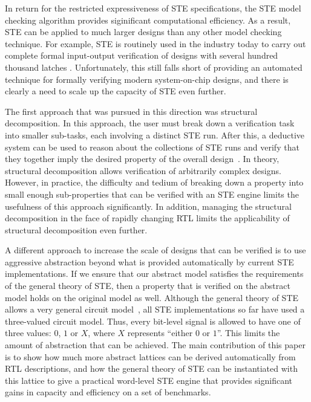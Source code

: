 \documentclass{llncs}
\begin{document}
In return for the restricted expressiveness of STE specifications, the
STE model checking algorithm provides siginificant computational
efficiency.  As a result, STE can be applied to much larger designs
than any other model checking technique.  For example, STE is
routinely used in the industry today to carry out complete formal
input-output verification of designs with several hundred thousand
latches \cite{KumarGuptaGhughal12,KaivolaEtAl09}.  Unfortunately, this
still falls short of providing an automated technique for formally
verifying modern system-on-chip designs, and there is clearly a need
to scale up the capacity of STE even further.

The first approach that was pursued in this direction was structural
decomposition.  In this approach, the user must break down a
verification task into smaller sub-tasks, each involving a distinct STE
run.  After this, a deductive system can be used to reason about the
collections of STE runs and verify that they together imply the
desired property of the overall design~\cite{JonesOSAM01}.
In theory, structural decomposition allows verification of arbitrarily
complex designs.  However, in practice, the difficulty and tedium of
breaking down a property into small enough sub-properties that can be
verified with an STE engine limits the usefulness of this approach
significantly.  In addition, managing the structural decomposition in
the face of rapidly changing RTL limits the applicability of
structural decomposition even further.

A different approach to increase the scale of designs that can be
verified is to use aggressive abstraction beyond what is provided
automatically by current STE implementations.  If we ensure that our
abstract model satisfies the requirements of the general theory of
STE, then a property that is verified on the abstract model holds on
the original model as well.  Although the general theory of STE allows
a very general circuit model~\cite{SegerBryant95}, all STE
implementations so far have used a three-valued circuit model.  Thus,
every bit-level signal is allowed to have one of three values: $0$,
$1$ or $X$, where $X$ represents ``either $0$ or $1$''.  This limits
the amount of abstraction that can be achieved.  The main contribution
of this paper is to show how much more abstract lattices can be
derived automatically from RTL descriptions, and how the general
theory of STE can be instantiated with this lattice to give a
practical word-level STE engine that provides significant gains in
capacity and efficiency on a set of benchmarks.
\end{document}
